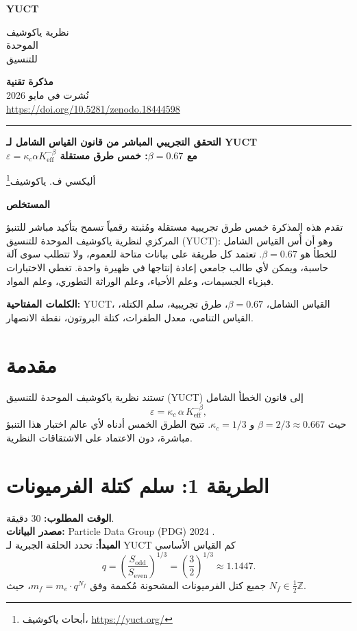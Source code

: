 \documentclass[12pt,a4paper]{article}
\newcommand{\Sodd}{S_{\mathrm{odd}}}
\newcommand{\Seven}{S_{\mathrm{even}}}
\newcommand{\Ke}{K_{\mathrm{eff}}}   %
\newcommand{\makeheader}{%
	\noindent
	\begin{minipage}{0.17\textwidth}
		\raggedright
		{\sffamily\bfseries\color{skyblue}\fontsize{40}{40}\selectfont YUCT}%
	\end{minipage}%
	\hspace{30pt}
	\begin{minipage}{0.32\textwidth}
		\raggedright
		{\sffamily\fontsize{11}{13}\selectfont نظرية ياكوشيف\\ الموحدة\\ للتنسيق}%
	\end{minipage}%
	\hfill
	\begin{minipage}{0.38\textwidth}
		\raggedleft
		{\sffamily\bfseries مذكرة تقنية}\\
		{\sffamily نُشرت في مايو 2026}\\
		{\sffamily\footnotesize \scriptsize\url{https://doi.org/10.5281/zenodo.18444598}}%
	\end{minipage}
	\par\vspace{5pt}
	\noindent\textcolor{gold}{\rule{\textwidth}{1.6pt}}
	\par\vspace{0pt}
}
\begin{document}
	\thispagestyle{firstpage}
	\makeheader
	
	\vspace{0cm}
	{\LARGE\bfseries التحقق التجريبي المباشر من قانون القياس الشامل لـ YUCT \\ 
		\Large \(\varepsilon = \kappa_c \alpha \Ke^{-\beta}\) مع \(\beta = 0.67\): خمس طرق مستقلة \par}
	\vspace{0.2cm}
	
	{\large أليكسي ف. ياكوشيف\footnote{أبحاث ياكوشيف، \url{https://yuct.org/}}} \\
	\vspace{0.0cm}
	
	{\color{darkblue}\textbf{\LARGE المستخلص}} \par
	{\large
		\noindent
		تقدم هذه المذكرة خمس طرق تجريبية مستقلة ومُثبتة رقمياً تسمح بتأكيد مباشر للتنبؤ المركزي لنظرية ياكوشيف الموحدة للتنسيق (YUCT): وهو أن أُس القياس الشامل للخطأ هو \(\beta = 0.67\). تعتمد كل طريقة على بيانات متاحة للعموم، ولا تتطلب سوى آلة حاسبة، ويمكن لأي طالب جامعي إعادة إنتاجها في ظهيرة واحدة. تغطي الاختبارات فيزياء الجسيمات، وعلم الأحياء، وعلم الوراثة التطوري، وعلم المواد.
	}
	
	\vspace{0.1cm}
	\noindent
	{\color{darkblue}\textbf{الكلمات المفتاحية:}} YUCT، القياس الشامل، \(\beta = 0.67\)، طرق تجريبية، سلم الكتلة، القياس التنامي، معدل الطفرات، كتلة البروتون، نقطة الانصهار.
	
	\vspace{0.4cm}
	
	\section{مقدمة}
	تستند نظرية ياكوشيف الموحدة للتنسيق (YUCT) إلى قانون الخطأ الشامل
	\begin{equation}\label{eq:error-law}
		\varepsilon = \kappa_c \, \alpha \, \Ke^{-\beta},
	\end{equation}
	حيث \(\beta = 2/3 \approx 0.667\) و \(\kappa_c = 1/3\). تتيح الطرق الخمس أدناه لأي عالم اختبار هذا التنبؤ مباشرة، دون الاعتماد على الاشتقاقات النظرية.
	
	\section{الطريقة 1: سلم كتلة الفرميونات}
	\label{sec:massladder}
	
	\textbf{الوقت المطلوب:} 30 دقيقة.\\
	\textbf{مصدر البيانات:} Particle Data Group (PDG) 2024 \cite{PDG2024}.\\
	\textbf{المبدأ:} تحدد الحلقة الجبرية لـ YUCT كم القياس الأساسي
	\[
	q = \left( \frac{\Sodd}{\Seven} \right)^{1/3} = \left( \frac{3}{2} \right)^{1/3} \approx 1.1447.
	\]
	جميع كتل الفرميونات المشحونة مُكممة وفق \(m_f = m_e \cdot q^{N_f}\)، حيث \(N_f \in \frac{1}{2}\mathbb{Z}\).
	
\end{document}
